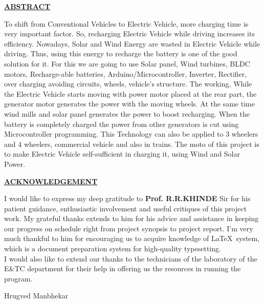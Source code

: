 \documentclass[a4paper,12pt]{article}
\begin{document}
\newpage
\begin{center}
\textbf{\LARGE\scshape\underline{ABSTRACT}}\\[2cm]
\end{center}
\large To shift from Conventional Vehicles to Electric Vehicle, more charging time
is very important factor. So, recharging Electric Vehicle while driving
increases its efficiency. Nowadays, Solar and Wind Energy are wasted in
Electric Vehicle while driving. Thus, using this energy to recharge the
battery is one of the good solution for it. For this we are going to use Solar
panel, Wind turbines, BLDC motors, Recharge-able batteries,
Arduino/Microcontroller, Inverter, Rectifier, over charging avoiding circuits,
wheels, vehicle’s structure. The working, While the Electric Vehicle starts
moving with power motor placed at the rear part, the generator motor
generates the power with the moving wheels. At the same time wind mills
and solar panel generates the power to boost recharging. When the battery is
completely charged the power from other generators is cut using
Microcontroller programming. This Technology can also be applied to 3
wheelers and 4 wheelers, commercial vehicle and also in trains. The moto of
this project is to make Electric Vehicle self-sufficient in charging it, using
Wind and Solar Power.

\newpage
\begin{center}
\textbf{\LARGE\scshape\underline{ACKNOWLEDGEMENT}}\\[2cm]
\end{center}
\large I would like to express my deep gratitude to \textbf{Prof. R.R.KHINDE} Sir for his  patient guidance, enthusiastic involvement and useful critiques of this project work. My grateful thanks extends to him for his advice and assistance in keeping our progress on schedule right from project synopsis to project report. I'm very much thankful to him for encouraging us to acquire knowledge of \LaTeX \ system, which is a document preparation system for high-quality typesetting.\\

\large I would also like to extend our thanks to the technicians of the laboratory of the E\&TC department for their help in offering us the resources in running the program.\\

\vspace{4cm}
\begin{flushright}
Hrugved Manbhekar\\



\end{flushright}
\end{document}
